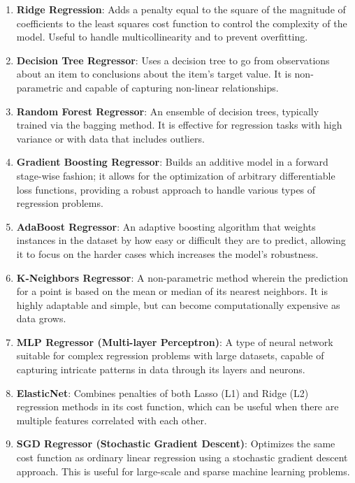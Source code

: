 \begin{enumerate}
    \item \textbf{Ridge Regression}: Adds a penalty equal to the square of the magnitude of coefficients to the least squares cost function to control the complexity of the model. Useful to handle multicollinearity and to prevent overfitting.

    \item \textbf{Decision Tree Regressor}: Uses a decision tree to go from observations about an item to conclusions about the item's target value. It is non-parametric and capable of capturing non-linear relationships.

    \item \textbf{Random Forest Regressor}: An ensemble of decision trees, typically trained via the bagging method. It is effective for regression tasks with high variance or with data that includes outliers.

    \item \textbf{Gradient Boosting Regressor}: Builds an additive model in a forward stage-wise fashion; it allows for the optimization of arbitrary differentiable loss functions, providing a robust approach to handle various types of regression problems.

    \item \textbf{AdaBoost Regressor}: An adaptive boosting algorithm that weights instances in the dataset by how easy or difficult they are to predict, allowing it to focus on the harder cases which increases the model's robustness.

    \item \textbf{K-Neighbors Regressor}: A non-parametric method wherein the prediction for a point is based on the mean or median of its nearest neighbors. It is highly adaptable and simple, but can become computationally expensive as data grows.

    \item \textbf{MLP Regressor (Multi-layer Perceptron)}: A type of neural network suitable for complex regression problems with large datasets, capable of capturing intricate patterns in data through its layers and neurons.

    \item \textbf{ElasticNet}: Combines penalties of both Lasso (L1) and Ridge (L2) regression methods in its cost function, which can be useful when there are multiple features correlated with each other.

    \item \textbf{SGD Regressor (Stochastic Gradient Descent)}: Optimizes the same cost function as ordinary linear regression using a stochastic gradient descent approach. This is useful for large-scale and sparse machine learning problems.


\end{enumerate}
